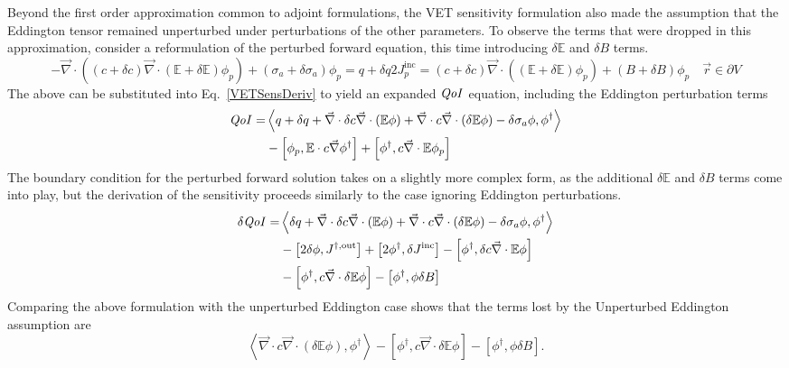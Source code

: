 \documentclass[12pt]{report}
\newcommand{\vr}{\vec{r}}
\newcommand{\bra}{\left\langle}
\newcommand{\ket}{\right\rangle}
\newcommand{\sbra}{\left[}
\newcommand{\sket}{\right]}
\renewcommand{\div}{\vec{\nabla} \cdot}
\newcommand{\grad}{\vec{\nabla}}
\newcommand{\Edd}{\mathbb{E}}
\newcommand{\BEdd}{B}
\newcommand{\siga}{\sigma_a}
\newcommand{\isigt}{c}
\newcommand{\scalSource}{q}
\newcommand{\qoi}{{\it QoI}\xspace}
\begin{document}
Beyond the first order approximation common to adjoint formulations, the VET sensitivity formulation also made the assumption that the Eddington tensor remained unperturbed under perturbations of the other parameters. To observe the terms that were dropped in this approximation, consider a reformulation of the perturbed forward equation, this time introducing $\delta \Edd$ and $\delta  B$ terms. 
\begin{subequations}
\begin{equation}
\label{VEFPerEdd}
- \div \left((\isigt + \delta \isigt)\div (\Edd + \delta \Edd) \phi_p \right) + (\siga + \delta \siga)\phi_p = \scalSource + \delta \scalSource
\end{equation}
\begin{equation}
2J_p^{\text{inc}} =
(\isigt + \delta \isigt) \vec{\nabla} \cdot \left((\Edd + \delta \Edd) \phi_p \right)  + (\BEdd +\delta \BEdd) \phi_p \quad \vr \in \partial V
\end{equation}
\end{subequations}
The above can be substituted into Eq.~\eqref{VETSensDeriv} to yield an expanded $\qoi$ equation, including the Eddington perturbation terms
\begin{equation}
\label{QoIVETAdjNoBCEdd}
\begin{split}
\qoi =& \bra \scalSource + \delta \scalSource + \div \delta \isigt \div \left( \Edd \phi \right) + \div \isigt \div \left( \delta \Edd \phi \right) - \delta \siga \phi, \phi^\dag \ket \\
&- \sbra \phi_p, \Edd \cdot \isigt \grad \phi^\dag \sket 
+ \sbra \phi^\dag , \isigt \div \Edd \phi_p \sket
\end{split}
\end{equation}
The boundary condition for the perturbed forward solution takes on a slightly more complex form, as the additional $\delta \Edd$ and $\delta \BEdd$ terms come into play, but the derivation of the sensitivity proceeds similarly to the case ignoring Eddington perturbations.
\begin{equation}
\label{QoIVETAdjEdd}
\begin{split}
\delta \qoi =& \bra \delta \scalSource + \div \delta \isigt \div \left( \Edd \phi \right) + \div \isigt \div \left( \delta \Edd \phi \right) - \delta \siga \phi, \phi^\dag \ket \\
&- \sbra 2\delta \phi, J^{\dag, \text{out}} \sket  + \sbra 2\phi^\dag, \delta J^{\text{inc}} \sket
- \sbra \phi^\dag, \delta \isigt \div \Edd \phi \sket
\\
&- \sbra  \phi^\dag ,\isigt \div \delta \Edd \phi \sket
- \sbra \phi^\dag, \phi \delta \BEdd \sket
\end{split}
\end{equation} 
Comparing the above formulation with the unperturbed Eddington case shows that the terms lost by the Unperturbed Eddington assumption are 
\begin{equation}
\label{EddErr}
 \bra \div \isigt \div \left( \delta \Edd \phi \right), \phi^\dag \ket
- \sbra  \phi^\dag ,\isigt \div \delta \Edd \phi \sket
- \sbra \phi^\dag, \phi \delta \BEdd \sket.
\end{equation} 
\end{document}
